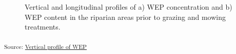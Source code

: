 \documentclass[
]{agujournal2019}
\begin{document}
\begin{figure}[H]


\caption{\label{fig-vertical-wep}Vertical and longitudinal profiles of
a) WEP concentration and b) WEP content in the riparian areas prior to
grazing and mowing treatments.}

\end{figure}%

\textsubscript{Source:
\href{https://alex-koiter.github.io/riparian-grazing-manuscript/notebooks/04_Vertical_profile-preview.html\#cell-fig-vertical-WEP}{Vertical
profile of WEP}}
\end{document}

